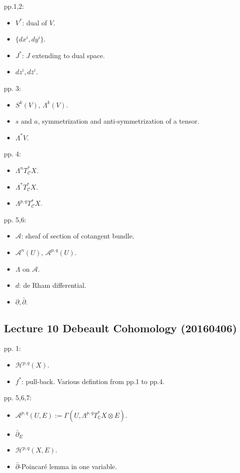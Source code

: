 \documentclass{article}
\numberwithin{equation}{subsection} %
\begin{document}
	pp.1,2:
	\begin{itemize}
		\item $V^*$: dual of $V$.
		\item $\{dx^i,dy^i\}$.
		\item $J^*$: $J$ extending to dual space.
		\item $dz^i,d\bar{z}^i$.
	\end{itemize}
	pp. 3:
	\begin{itemize}
		\item $S^k(V)$, $\Lambda^k(V)$.
		\item $s$ and $a$, symmetrization and anti-symmetrization of a tensor.
		\item $\Lambda^* V$.
	\end{itemize}
	pp. 4:
	\begin{itemize}
		\item $\Lambda^n T^*_{\mathcal{C}}X$.
		\item $\Lambda^* T^*_{\mathcal{C}}X$.
		\item $\Lambda^{p,q} T^*_{\mathcal{C}}X$.
	\end{itemize}
	pp. 5,6:
	\begin{itemize}
		\item $\mathcal{A}$: sheaf of section of cotangent bundle.
		\item $\mathcal{A}^n(U)$, $\mathcal{A}^{p,q}(U)$.
		\item $\Lambda$ on $\mathcal{A}$.
		\item $d$: de Rham differential.
		\item $\partial, \bar{\partial}$.
	\end{itemize}
	
	\subsection{Lecture 10 Debeault Cohomology (20160406)}
	
	pp. 1:
	\begin{itemize}
		\item $\mathcal{H}^{p,q}(X)$.
		\item $f^*$: pull-back. Various defintion from pp.1 to pp.4.
	\end{itemize}
	pp. 5,6,7:
	\begin{itemize}
		\item $\mathcal{A}^{p,q}(U,E):=\Gamma(U,\Lambda^{p,q}T_{\mathbb{C}}^* X \otimes E)$.
		\item $\bar{\partial}_E$
		\item $\mathcal{H}^{p,q}(X,E)$.
		\item $\bar{\partial}$-Poincaré lemma in one variable.
	\end{itemize}
	
\end{document}
